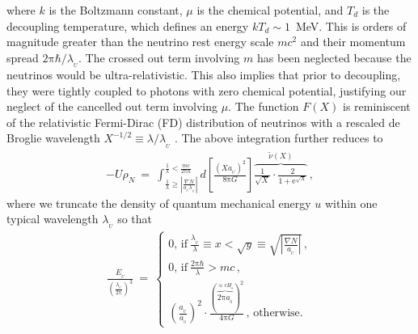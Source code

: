 \documentclass[fleqn,usenatbib,useAMS]{mnras} %
\begin{document}
where $k$ is the Boltzmann constant, $\mu$ is the chemical potential, and $T_d$ is the decoupling temperature, which defines an energy $kT_d \sim 1$~MeV. This is orders of magnitude greater than the neutrino rest energy scale $mc^2$ and their momentum spread $2\mathrm{\pi}\hbar/\lambda_{_U}$. The crossed out term involving $m$ has been neglected because the neutrinos would be ultra-relativistic. This also implies that prior to decoupling, they were tightly coupled to photons with zero chemical potential, justifying our neglect of the cancelled out term involving $\mu$. The function $F\left(X \right)$ is reminiscent of the relativistic Fermi-Dirac (FD) distribution of neutrinos with a rescaled de Broglie wavelength $X^{-1/2} \equiv \lambda/\lambda_{_U}$ \citep[c.f.][]{Zhao_2008_neutrinos}. The above integration further reduces to
\begin{eqnarray}
    -U \rho_N ~=~ \int^{\frac{1}{\lambda} < \frac{mc}{2\mathrm{\pi}\hbar}}_{\frac{1}{\lambda} \ge \left|\frac{\nabla N }{a_{_U}\lambda_{_U}}\right|} d\left[ \frac{\left(X a_{_U}\right)^2}{8\mathrm{\pi} G} \right]  \overbrace{\frac{1}{\sqrt{X}} \cdot \frac{2}{1 + \mathrm{e}^{\sqrt{X}}}}^{\widetilde{\nu} \left( X \right)} \, ,
    \label{covnu}
\end{eqnarray}
where we truncate the density of quantum mechanical energy $u$ within one typical wavelength $\lambda_{_U}$ so that \citep[c.f.][]{Zhao_2008_neutrinos}
\begin{eqnarray}
	\frac{E_{_U}}{\left( \frac{\lambda_{_U}}{2\mathrm{\pi}} \right)^3} ~=~ \left\{
	\begin{array}{l}
		0 \text{, if}~\frac{\lambda_{_U}}{\lambda} \equiv x < \sqrt{y} \equiv 
 \sqrt{\left|\frac{\nabla N }{a_{_U}}\right|}\, , \\ 
		0 \text{, if}~\frac{2\mathrm{\pi}\hbar}{\lambda} > m c \, , \\
		\left( \frac{a_{_U}}{a_{_0}} \right)^2 \cdot \frac{\left(\overbrace{2 \mathrm{\pi} a_{_0}}^{\approx c H_{_0}}\right)^2}{4\mathrm{\pi} G} \, \text{, otherwise.}
	\end{array}
\right.
\end{eqnarray}
\end{document}
